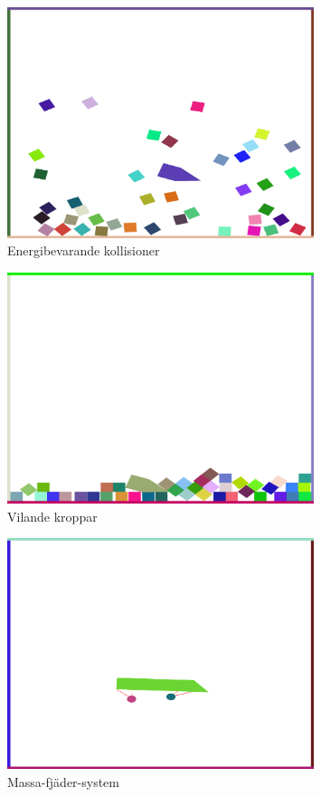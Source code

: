 \documentclass[a4paper,12pt,twopage,swedish]{article}
\begin{document}
\begin{figure}[H]
	\centering
	\includegraphics[width=0.8\textwidth]{illustrations/printscreen_general.png}
	\caption{Energibevarande kollisioner}
	\label{fig:general}
\end{figure}
\begin{figure}[H]
	\centering
	\includegraphics[width=0.8\textwidth]{illustrations/printscreen_resting.png}
	\caption{Vilande kroppar}
	\label{fig:resting}
\end{figure}
\begin{figure}[H]
	\centering
	\includegraphics[width=0.8\textwidth]{illustrations/printscreen_a_vagn_that_can_go.png}
	\caption{Massa-fjäder-system}
	\label{fig:vagn_that_can_go}
\end{figure}
\end{document}
